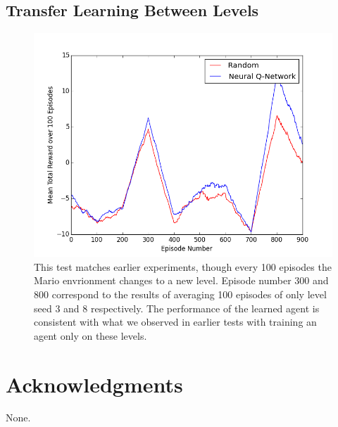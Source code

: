 \documentclass{article}
\begin{document}
 \subsection{Transfer Learning Between Levels}
 
 \begin{figure}
\begin{center}
\includegraphics[scale=0.42]{transfer_levels.png}
\caption{This test matches earlier experiments, though every 100 episodes the Mario envrionment changes to a new level. Episode number 300 and 800 correspond to the results of averaging 100 episodes of only level seed 3 and 8 respectively. The performance of the learned agent is consistent with what we observed in earlier tests with training an agent only on these levels.}
\end{center}
\end{figure}
 
\section*{Acknowledgments} 
 
None.



\end{document}
